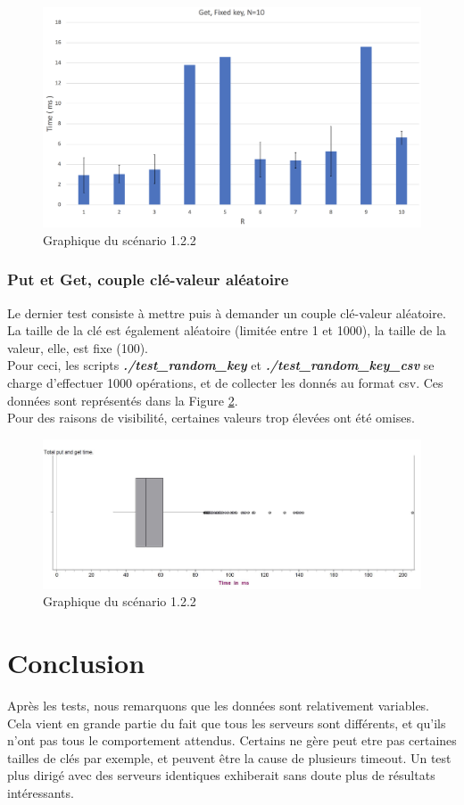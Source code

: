 \documentclass{article}
\begin{document}
\begin{figure}
 	\includegraphics[scale = 0.25]{img/Get}
 	\caption{Graphique du scénario 1.2.2}
 	\label{figGet}
\end{figure}

\subsubsection{Put et Get, couple clé-valeur aléatoire}
Le dernier test consiste à mettre puis à demander un couple clé-valeur aléatoire. La taille de la clé est également aléatoire (limitée entre 1 et 1000), la taille de la valeur, elle, est fixe (100). \\
Pour ceci, les scripts \textbf{\textit{./test\_random\_key}} et \textbf{\textit{./test\_random\_key\_csv}} se charge d'effectuer 1000 opérations, et de collecter les donnés au format csv. Ces données sont représentés dans la Figure \ref{figRandom}. \\
Pour des raisons de visibilité, certaines valeurs trop élevées ont été omises.


\begin{figure}
	\center
 	\includegraphics[scale = 0.25]{img/Random.JPG}
 	\caption{Graphique du scénario 1.2.2}
 	\label{figRandom}
\end{figure}

\section{Conclusion}
Après les tests, nous remarquons que les données sont relativement variables. Cela vient en grande partie du fait que tous les serveurs sont différents, et qu'ils n'ont pas tous le comportement attendus. Certains ne gère peut etre pas certaines tailles de clés par exemple, et peuvent être la cause de plusieurs timeout. Un test plus dirigé avec des serveurs identiques exhiberait sans doute plus de résultats intéressants.
\end{document}

